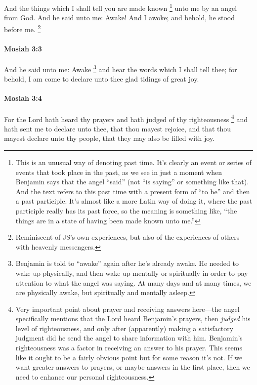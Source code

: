 			And the things which I shall tell you
			are made known%
				\footnote{%
					\label{MOSIAH-3-2-NOTE-made-known}%
					This is an unusual way of denoting past time. It's clearly an event or series of events that took place in the past, as we see in just a moment when Benjamin says that the angel ``said'' (not ``is saying'' or something like that). And the text refers to this past time with a present form of ``to be'' and then a past participle. It's almost like a more Latin way of doing it, where the past participle really has its past force, so the meaning is something like, ``the things are in a state of having been made known unto me.''
					}
			unto me by an angel from God.
			And he said unto me:
			Awake!
			And I awoke;
			and behold, he stood before me.%
				\footnote{%
					\label{MOSIAH-3-2-NOTE-angel}%
					Reminiscent of JS's own experiences, but also of the experiences of others with heavenly messengers.
					}

		\paragraph{Mosiah 3:3} %
			\label{MOSIAH-3-3}

			And he said unto me:
			Awake%
				\footnote{%
					\label{MOSIAH-3-3-NOTE-awake}%
					Benjamin is told to ``awake'' again after he's already awake. He needed to wake up physically, and then wake up mentally or spiritually in order to pay attention to what the angel was saying. At many days and at many times, we are physically awake, but spiritually and mentally asleep.
					}
			and hear the words which I shall tell thee;
			for behold, I am come to declare unto thee glad tidings of great joy.

		\paragraph{Mosiah 3:4} %
			\label{MOSIAH-3-4}

			For the Lord hath heard thy prayers and hath judged of thy righteousness%
				\footnote{%
					\label{MOSIAH-3-4-NOTE-judged}%
					Very important point about prayer and receiving answers here---the angel specifically mentions that the Lord heard Benjamin's prayers, then \textit{judged} his level of righteousness, and only after (apparently) making a satisfactory judgment did he send the angel to share information with him. Benjamin's righteousness was a factor in receiving an answer to his prayer. This seems like it ought to be a fairly obvious point but for some reason it's not. If we want greater answers to prayers, or maybe answers in the first place, then we need to enhance our personal righteousness.
					}
			and hath sent me to declare unto thee,
			that thou mayest rejoice,
			and that thou mayest declare unto thy people,
			that they may also be filled with joy.


